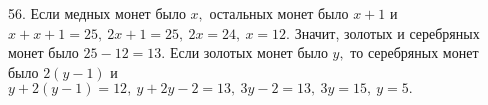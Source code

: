 56. Если медных монет было $x,$ остальных монет было $x+1$ и $x+x+1=25,\ 2x+1=25,\ 2x=24,\ x=12.$ Значит, золотых и серебряных монет было $25-12=13.$ Если золотых монет было $y,$ то серебряных монет было $2(y-1)$ и $y+2(y-1)=12,\ y+2y-2=13,\ 3y-2=13,\ 3y=15,\ y=5.$\\
